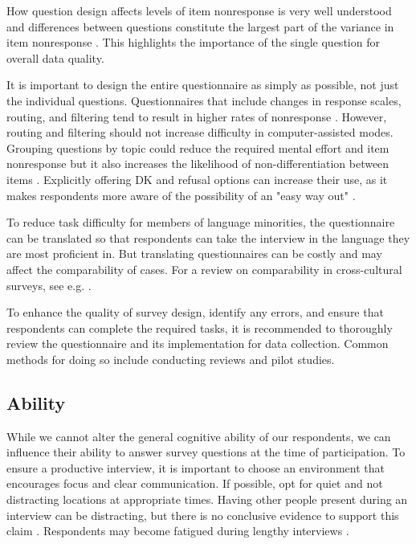 \documentclass[a4paper,12pt]{article}
\begin{document}
How question design affects levels of item nonresponse is very well understood and differences between questions constitute the largest part of the variance in item nonresponse \citep{olsonEffectsRespondentQuestion2019}. This highlights the importance of the single question for overall data quality.

It is important to design the entire questionnaire as simply as possible, not just the individual questions. Questionnaires that include changes in response scales, routing, and filtering tend to result in higher rates of nonresponse \citep{messerDeterminantsItemNonresponse2012}. However, routing and filtering should not increase difficulty in computer-assisted modes. Grouping questions by topic could reduce the required mental effort and item nonresponse but it also increases the likelihood of non-differentiation between items \citep{krosnickResponseStrategiesCoping1991}. Explicitly offering DK and refusal options can increase their use, as it makes respondents more aware of the possibility of an "easy way out" \citep{schumanAssessmentNoOpinion1979, beattyAnswerNotAnwer2002}.

To reduce task difficulty for members of language minorities, the questionnaire can be translated so that respondents can take the interview in the language they are most proficient in. But translating questionnaires can be costly and may affect the comparability of cases. For a review on comparability in cross-cultural surveys, see e.g. \citet{behrTranslationMeasurementInstruments2016}.

To enhance the quality of survey design, identify any errors, and ensure that respondents can complete the required tasks, it is recommended to thoroughly review the questionnaire and its implementation for data collection. Common methods for doing so include conducting reviews and pilot studies.

\subsection{Ability}

While we cannot alter the general cognitive ability of our respondents, we can influence their ability to answer survey questions at the time of participation. To ensure a productive interview, it is important to choose an environment that encourages focus and clear communication. If possible, opt for quiet and not distracting locations at appropriate times. Having other people present during an interview can be distracting, but there is no conclusive evidence to support this claim \citep{kupekDeterminantsItemNonresponse1998, tuSocialDistanceRespondent2007, silberEffectsQuestionRespondent2021}. Respondents may become fatigued during lengthy interviews \citep{holbrookInterviewerErrorsHelp2016, olsonEffectsRespondentQuestion2019}.
\end{document}
